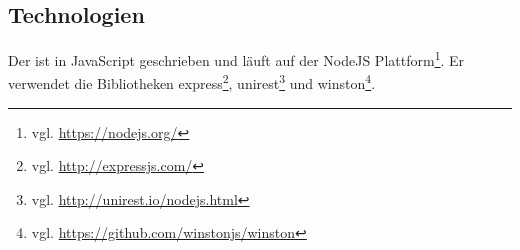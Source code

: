 \subsection{Technologien}
    Der {\annotationService} ist in JavaScript geschrieben und läuft auf der
    NodeJS Plattform\footnote{vgl. \url{https://nodejs.org/}}.
    Er verwendet die Bibliotheken
    express\footnote{vgl. \url{http://expressjs.com/}},
    unirest\footnote{vgl. \url{http://unirest.io/nodejs.html}}
    und winston\footnote{vgl. \url{https://github.com/winstonjs/winston}}.